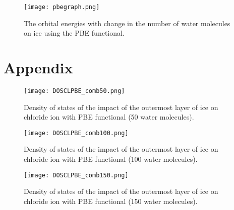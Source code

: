 \documentclass[a4paper,11pt]{report}
\begin{document}
\begin{figure}[H]\large
\texttt{[image: pbegraph.png]}
\caption{The orbital energies with change in the number of water molecules on ice using the PBE functional.}
\label{figure5}
\end{figure}





\section{Appendix}
\begin{figure}[H]\large
\texttt{[image: DOSCLPBE\_comb50.png]}
\caption{Density of states of the impact of the outermost layer of ice on chloride ion with PBE functional (50 water molecules).}
\label{figure1b}
\end{figure}

\begin{figure}[H]\large
\texttt{[image: DOSCLPBE\_comb100.png]}
\caption{Density of states of the impact of the outermost layer of ice on chloride ion with PBE functional (100 water molecules).}
\label{figure2b}
\end{figure}

\begin{figure}[H]\large
\texttt{[image: DOSCLPBE\_comb150.png]}
\caption{Density of states of the impact of the outermost layer of ice on chloride ion with PBE functional (150 water molecules).}
\label{figure3b}
\end{figure}










\end{document}

